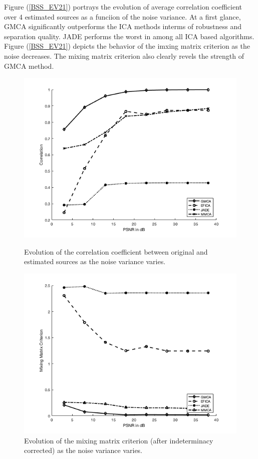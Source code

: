 
Figure (\ref{BSS_EV21}) portrays the evolution of average correlation coefficient over 4 estimated sources as a funciion of the noise variance. At a first glance, GMCA significantly outperforms the ICA methods interms of robustness and separation quality. JADE performs the worst in among all ICA based algorithms. Figure (\ref{BSS_EV21}) depicts the behavior of the imxing matrix criterion as the noise decreases. The mixing matrix criterion also clearly revels the strength of GMCA method.\\

\begin{figure}[!htbp]
\centering
\begin{minipage}[b]{0.49\textwidth}
\includegraphics[width=\textwidth]{images/image_separation1.png}
\caption{Evolution of the correlation coefficient between original and estimated sources as the noise variance varies.}
\label{BSS_EV21}
\end{minipage}
\begin{minipage}[b]{0.49\textwidth}
\includegraphics[width=\textwidth]{images/image_separation2.png}
\caption{Evolution of the mixing matrix criterion (after indeterminacy corrected) as the noise variance varies.}
\label{BSS_EV22}
\end{minipage}
\end{figure}
